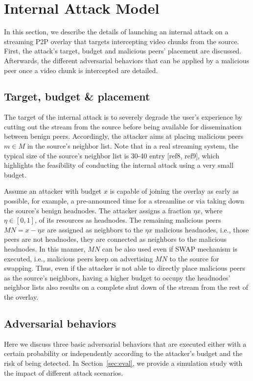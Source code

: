 \section{Internal Attack Model}
\label{sec:Attack}

In this section, we describe the details of launching an internal attack on a streaming P2P overlay that targets intercepting video chunks from the source. 
First, the attack's target, budget and malicious peers' placement are discussed. Afterwards, the different adversarial behaviors that can be applied by a malicious peer once a video chunk is intercepted are detailed.

\subsection{Target, budget \& placement}

The target of the internal attack is to severely degrade the user's experience by cutting out the stream from the source before being available for dissemination between benign peers.
Accordingly, the attacker aims at placing malicious peers $m\in M$ in the source's neighbor list.
Note that in a real streaming system, the typical size of the source's neighbor list is 30-40 entry [ref8, ref9], which highlights the feasibility of conducting the internal attack using a very small budget.


Assume an attacker with budget $x$ is capable of joining the overlay as early as possible, for example, a pre-announced time for a streamline or via taking down the source's benign headnodes.
The attacker assigns a fraction $\eta x$, where $\eta\in [0,1]$, of its resources as headnodes.
The remaining malicious peers $MN=x-\eta x$ are assigned as neighbors to the $\eta x$ malicious headnodes, i.e., those peers are not headnodes, they are connected as neighbors to the malicious headnodes.
In this manner, $MN$ can be also used even if SWAP \cite{nguyen2016swap} mechanism is executed, i.e., malicious peers keep on advertising $MN$ to the source for swapping.
Thus, even if the attacker is not able to directly place malicious peers as the source's neighbors, having a higher budget to occupy the headnodes' neighbor lists also results on a complete shut down of the stream from the rest of the overlay.

\subsection{Adversarial behaviors}
Here we discuss three basic adversarial behaviors that are executed either with a certain probability or independently according to the attacker's budget and the risk of being detected.
In Section~\ref{sec:eval}, we provide a simulation study with the impact of different attack scenarios.

